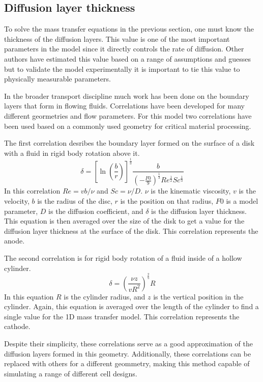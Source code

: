 \documentclass[journal=mamobx]{achemso}
\begin{document}
\subsection{Diffusion layer thickness}
To solve the mass transfer equations in the previous section, one must know the thickness of the diffusion layers.
This value is one of the most important parameters in the model since it directly controls the rate of diffusion. 
Other authors have estimated this value based on a range of assumptions and guesses but to validate the model experimentally it is important to tie this value to physically measurable parameters.

In the broader transport discipline much work has been done on the boundary layers that form in flowing fluids. 
Correlations have been developed for many different geormetries and flow parameters.
For this model two correlations have been used based on a commonly used geometry for critical material processing. 

The first correlation desribes the boundary layer formed on the surface of a disk with a fluid in rigid body rotation above it\cite{Smith_1972}.
\begin{equation}
    \delta = \left [\ln\left(\frac{b}{r}\right )\right]^\frac{1}{3}\frac{b}{\left(-\frac{F0}{9}\right)^\frac{1}{3}Re^\frac{1}{2}Sc^\frac{1}{3}}
    \label{eq:disk}
\end{equation}
In this correlation $Re = vb/\nu$ and $Sc = \nu/D$. $\nu$ is the kinematic viscosity, $v$ is the velocity, $b$ is the radius of the disc, $r$ is the position on that radius, $F0$ is a model parameter, $D$ is the diffusion coefficient, and $\delta$ is the diffusion layer thickness.
This equation is then averaged over the size of the disk to get a value for the diffusion layer thickness at the surface of the disk. 
This correlation represents the anode.

The second correlation is for rigid body rotation of a fluid inside of a hollow cylinder\cite{Rott1966}.
\begin{equation}
    \delta = \left ( \frac{\nu z}{vR^2}\right )^\frac{2}{5} R
    \label{eq:cylinder}
\end{equation}
In this equation $R$ is the cylinder radius, and $z$ is the vertical position in the cylinder. 
Again, this equation is averaged over the length of the cylinder to find a single value for the 1D mass transfer model. 
This correlation represents the cathode. 

Despite their simplicity, these correlations serve as a good approximation of the diffusion layers formed in this geometry. 
Additionally, these correlations can be replaced with others for a different geommetry, making this method capable of simulating a range of different cell designs. 
\end{document}
